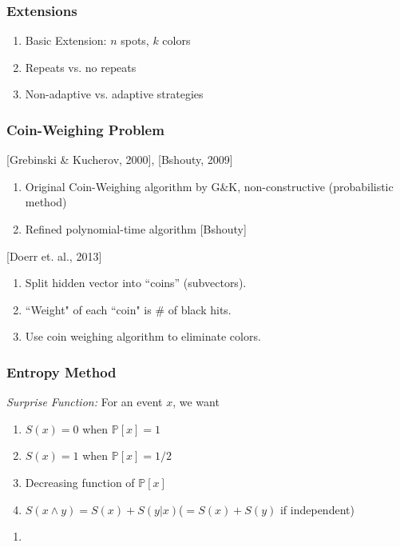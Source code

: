 \documentclass{beamer}
\begin{document}
    \begin{frame}
    	\frametitle{Extensions}
		\begin{enumerate}[label=\roman*.]
		\item Basic Extension: $n$ spots, $k$ colors
		\item Repeats vs. no repeats
		\item Non-adaptive vs. adaptive strategies
		\end{enumerate}
    \end{frame}
    
    \begin{frame}
    \frametitle{Coin-Weighing Problem}
    [Grebinski \& Kucherov, 2000], [Bshouty, 2009]
    \begin{enumerate}[label=\roman*.]
		\item Original Coin-Weighing algorithm by G\&K, non-constructive (probabilistic method)
		\item Refined polynomial-time algorithm [Bshouty]
	\end{enumerate}
    [Doerr et. al., 2013]
    	\begin{enumerate}[label=\roman*.]
		\item Split hidden vector into ``coins'' (subvectors).
		\item ``Weight" of each ``coin" is \# of black hits.
		\item Use coin weighing algorithm to eliminate colors.
		\end{enumerate}
    \end{frame}

    \begin{frame}
    \frametitle{Entropy Method}
    \textit{Surprise Function:} For an event $x$, we want
	
    	\begin{enumerate}[label=\arabic*.]
		\item $S(x) = 0$ when $\mathbb{P}[x]=1$
		\item $S(x) = 1$ when $\mathbb{P}[x]=1/2$
		\item Decreasing function of $\mathbb{P}[x]$
		\item $S(x \land y)=S(x)+S(y|x)$\quad ($=S(x)+S(y)$ if independent)\\[2\baselineskip]
	\end{enumerate}

	\begin{enumerate}[label=]
	\item{}
	\end{enumerate}
	\end{frame}
	
\end{document}
